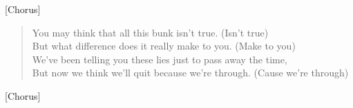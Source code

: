 [Chorus]

\begin{verse}
You may think that all this bunk isn't true. (Isn't true) \\
But what difference does it really make to you. (Make to you) \\
We've been telling you these lies just to pass away the time, \\
But now we think we'll quit because we're through. (Cause we're through) \\
\end{verse}

[Chorus]
